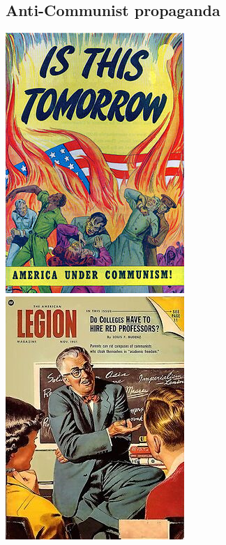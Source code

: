 \documentclass[12pt,a4paper]{article}
\begin{document}
	\subsection{Anti-Communist propaganda}
	\label{sec:Propaganda}
	\includegraphics{Propaganda/is-this-tomorrow.jpg}
	\includegraphics{Propaganda/colleges-hire-red-professors.jpg}
	\newpage
	\\
	\\
	\\
	\\
	\\
	\\
	{
		{}
		
	}
\end{document}
